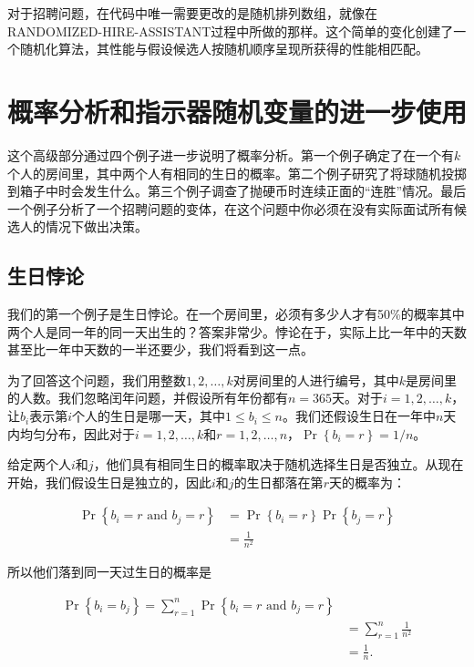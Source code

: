 \documentclass[lang=cn,newtx,10pt,scheme=chinese]{elegantbook}
\begin{document}
对于招聘问题，在代码中唯一需要更改的是随机排列数组，就像在RANDOMIZED-HIRE-ASSISTANT过程中所做的那样。这个简单的变化创建了一个随机化算法，其性能与假设候选人按随机顺序呈现所获得的性能相匹配。

\section{概率分析和指示器随机变量的进一步使用}

这个高级部分通过四个例子进一步说明了概率分析。第一个例子确定了在一个有$k$个人的房间里，其中两个人有相同的生日的概率。第二个例子研究了将球随机投掷到箱子中时会发生什么。第三个例子调查了抛硬币时连续正面的“连胜”情况。最后一个例子分析了一个招聘问题的变体，在这个问题中你必须在没有实际面试所有候选人的情况下做出决策。

\subsection{生日悖论}

我们的第一个例子是生日悖论。在一个房间里，必须有多少人才有50\%的概率其中两个人是同一年的同一天出生的？答案非常少。悖论在于，实际上比一年中的天数甚至比一年中天数的一半还要少，我们将看到这一点。

为了回答这个问题，我们用整数$1,2,\ldots,k$对房间里的人进行编号，其中$k$是房间里的人数。我们忽略闰年问题，并假设所有年份都有$n=365$天。对于$i=1,2,\ldots,k$，让$b_i$表示第$i$个人的生日是哪一天，其中$1\leq b_i\leq n$。我们还假设生日在一年中$n$天内均匀分布，因此对于$i=1,2,\ldots,k$和$r=1,2,\ldots,n$，$\operatorname{Pr}\left\{b_i=r\right\}=1/n$。

给定两个人$i$和$j$，他们具有相同生日的概率取决于随机选择生日是否独立。从现在开始，我们假设生日是独立的，因此$i$和$j$的生日都落在第$r$天的概率为：

$$
\begin{aligned}
\operatorname{Pr}\left\{b_i=r \text { and } b_j=r\right\} & =\operatorname{Pr}\left\{b_i=r\right\} \operatorname{Pr}\left\{b_j=r\right\} \\
& =\frac{1}{n^2}
\end{aligned}
$$

所以他们落到同一天过生日的概率是

$$
\begin{aligned}
\operatorname{Pr}\left\{b_i=b_j\right\}=\sum_{r=1}^n \operatorname{Pr}\left\{b_i=r \text { and } b_j=r\right\} \\
& =\sum_{r=1}^n \frac{1}{n^2} \\
& =\frac{1}{n} .
\end{aligned}
$$
\end{document}
